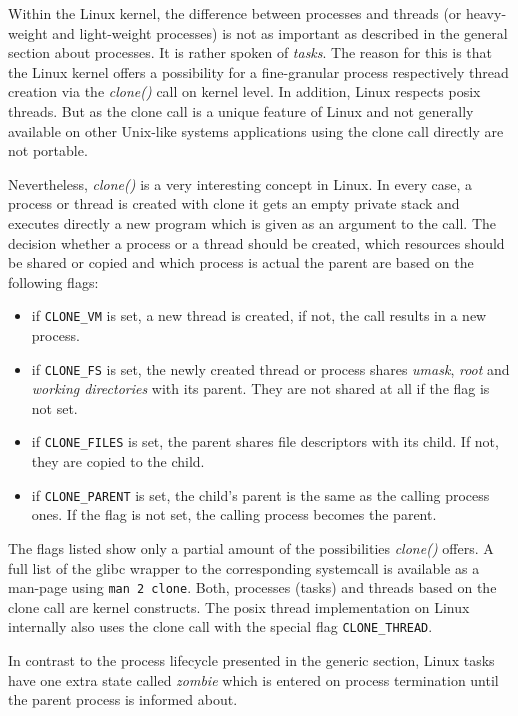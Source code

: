 Within the Linux kernel, the difference between processes and threads (or heavy-weight and light-weight processes) is not as important as described in the general section about processes.
It is rather spoken of \textit{tasks}.
The reason for this is that the Linux kernel offers a possibility for a fine-granular process respectively thread creation via the \textit{clone()} call on kernel level.
In addition, Linux respects \ac{posix} threads\cite{lfd430}.
But as the clone call is a unique feature of Linux and not generally available on other Unix-like systems applications using the clone call directly are not portable\cite{tanenbaum-modern-operating-systems}.

Nevertheless, \textit{clone()} is a very interesting concept in Linux.
In every case, a process or thread is created with clone it gets an empty private stack and executes directly a new program which is given as an argument to the call.
The decision whether a process or a thread should be created, which resources should be shared or copied and which process is actual the parent are based on the following flags:
\begin{itemize}
    \item if \texttt{CLONE\_VM} is set, a new thread is created, if not, the call results in a new process.
    \item if \texttt{CLONE\_FS} is set, the newly created thread or process shares \textit{umask}, \textit{root} and \textit{working directories} with its parent. They are not shared at all if the flag is not set.
    \item if \texttt{CLONE\_FILES} is set, the parent shares file descriptors with its child. If not, they are copied to the child.
    \item if \texttt{CLONE\_PARENT} is set, the child's parent is the same as the calling process ones. If the flag is not set, the calling process becomes the parent\cite{tanenbaum-modern-operating-systems}.
\end{itemize}

The flags listed show only a partial amount of the possibilities \textit{clone()} offers.
A full list of the glibc wrapper to the corresponding systemcall is available as a man-page using \texttt{man 2 clone}.
Both, processes (tasks) and threads based on the clone call are kernel constructs.
The \ac{posix} thread implementation on Linux internally also uses the clone call with the special flag \texttt{CLONE\_THREAD}.

In contrast to the process lifecycle presented in the generic section, Linux tasks have one extra state called \textit{zombie} which is entered on process termination until the parent process is informed about\cite{mandl2014Grundkurs}.


